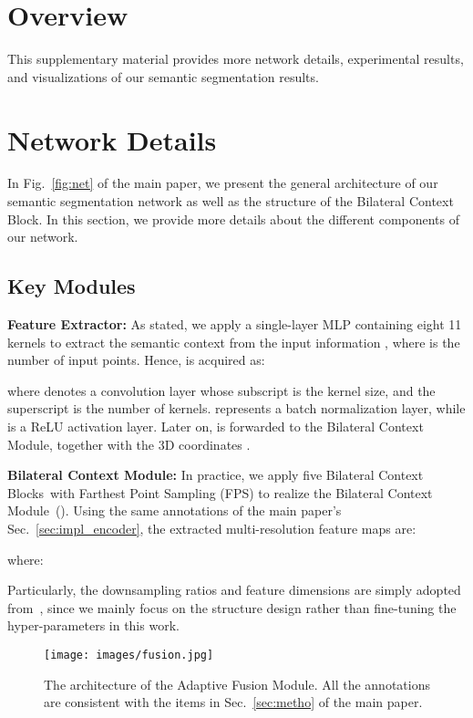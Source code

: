 \documentclass[10pt,twocolumn,letterpaper]{article}
\def\ourencoder{Bilateral Context Module}
\def\ourblock{Bilateral Context Block}
\def\ourblocks{Bilateral Context Blocks}
\def\ourdecoder{Adaptive Fusion Module}
\def\ourextractor{Feature Extractor}
\begin{document}
\section{Overview}
This supplementary material provides more network details, experimental results, and visualizations of our semantic segmentation results.
\section{Network Details}
In Fig.~\ref{fig:net} of the main paper, we present the general architecture of our semantic segmentation network as well as the structure of the \ourblock. In this section, we provide more details about the different components of our network.

\subsection{Key Modules}
\noindent \textbf{\ourextractor:}  As stated, we apply a single-layer MLP containing eight 11 kernels to extract the semantic context  from the input information , where  is the number of input points. Hence,  is acquired as:

where  denotes a convolution layer whose subscript is the kernel size, and the superscript is the number of kernels.  represents a batch normalization layer, while  is a ReLU activation layer. Later on,  is forwarded to the \ourencoder, together with the 3D coordinates .

\vspace{3mm}
\noindent \textbf{\ourencoder:}  In practice, we apply five \ourblocks~with Farthest Point Sampling (FPS) to realize the \ourencoder~(). Using the same annotations of the main paper’s Sec.~\ref{sec:impl_encoder}, the extracted multi-resolution feature maps are:

where:



Particularly, the downsampling ratios and feature dimensions are simply adopted from~\cite{hu2020randla}, since we mainly focus on the structure design rather than fine-tuning the hyper-parameters in this work.
\begin{figure}
\begin{center}
\texttt{[image: images/fusion.jpg]}
\end{center}
\caption{The architecture of the \ourdecoder. All the annotations are consistent with the items in Sec.~\ref{sec:metho} of the main paper.}
\label{fig:fusion}
\end{figure}
\end{document}
